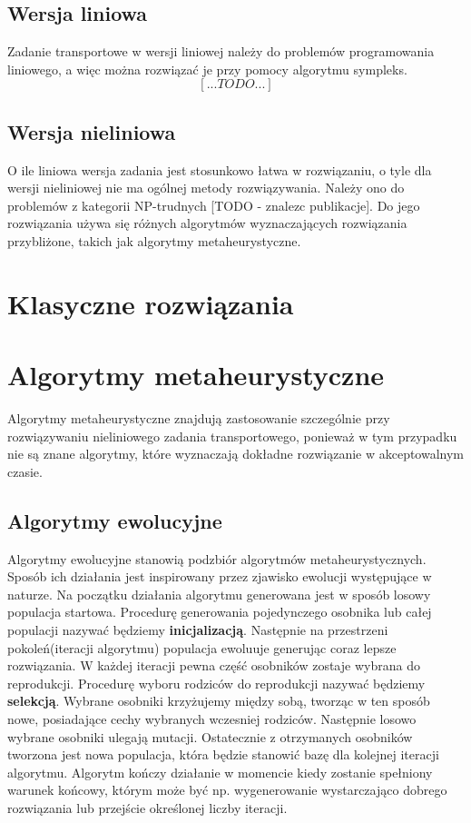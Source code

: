 \subsection{Wersja liniowa}
Zadanie transportowe w wersji liniowej należy do problemów programowania liniowego, a więc można rozwiązać je przy pomocy algorytmu sympleks.
$$[...TODO...]$$

\subsection{Wersja nieliniowa}
O ile liniowa wersja zadania jest stosunkowo łatwa w rozwiązaniu, o tyle dla wersji nieliniowej nie ma ogólnej metody rozwiązywania. Należy 
ono do problemów z kategorii NP-trudnych [TODO - znalezc publikacje]. Do jego rozwiązania używa się różnych algorytmów wyznaczających 
rozwiązania przybliżone, takich jak algorytmy metaheurystyczne.



\section{Klasyczne rozwiązania}


\section{Algorytmy metaheurystyczne}
Algorytmy metaheurystyczne znajdują zastosowanie szczególnie przy rozwiązywaniu nieliniowego zadania transportowego, ponieważ w tym przypadku 
nie są znane algorytmy, które wyznaczają dokładne rozwiązanie w akceptowalnym czasie. 

\subsection{Algorytmy ewolucyjne}
Algorytmy ewolucyjne stanowią podzbiór algorytmów metaheurystycznych. Sposób ich działania jest inspirowany przez zjawisko ewolucji występujące 
w naturze. Na początku działania algorytmu generowana jest w sposób losowy populacja startowa. Procedurę generowania pojedynczego osobnika lub 
całej populacji nazywać będziemy \textbf{inicjalizacją}. Następnie na przestrzeni pokoleń(iteracji algorytmu) 
populacja ewoluuje generując coraz lepsze rozwiązania. W każdej iteracji pewna część osobników zostaje wybrana do reprodukcji. Procedurę wyboru 
rodziców do reprodukcji nazywać będziemy \textbf{selekcją}. Wybrane osobniki krzyżujemy między sobą, tworząc w ten sposób nowe, 
posiadające cechy wybranych wczesniej rodziców. Następnie losowo wybrane osobniki ulegają mutacji. 
Ostatecznie z otrzymanych osobników tworzona jest nowa populacja, która będzie stanowić bazę dla kolejnej iteracji algorytmu. Algorytm kończy 
działanie w momencie kiedy zostanie spełniony warunek końcowy, którym może być np. wygenerowanie wystarczająco dobrego rozwiązania lub 
przejście określonej liczby iteracji.

